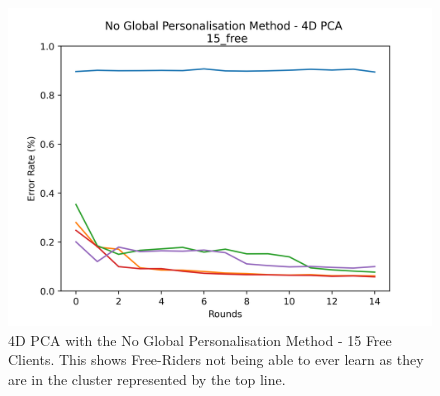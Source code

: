 \begin{figure}[htbp]
	\centering
    \includegraphics[scale=0.5]{my_agg/graphs/no_global_15free.png}
    \caption{4D PCA with the No Global Personalisation Method - 15 Free Clients. This shows Free-Riders not being able to ever learn as they are in the cluster represented by the top line.}
	\label{fig:no_15free}
\end{figure}

